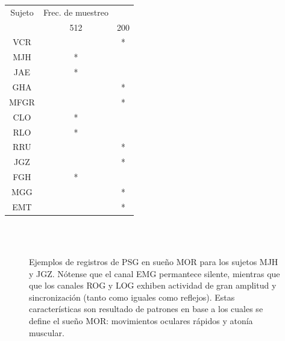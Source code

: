 \begin{table}
\begin{tabular}{c|cc}
Sujeto & Frec. de muestreo \\
& 512 & 200 \\
\hline
\hline
VCR & & * \\
MJH & * & \\ 
JAE & * & \\
GHA &  & * \\
MFGR &  & * \\
CLO & * & \\
RLO & * & \\
RRU &  & * \\
JGZ &  & * \\
\hline
FGH & * & \\
MGG &  & * \\
EMT &  & * \\
\end{tabular}
\label{frecuencias}
\end{table}

\begin{figure}
\centering
{}\\
\\
\caption{Ejemplos de registros de PSG en sue\~no MOR para los sujetos MJH y JGZ.
N\'otense que el canal EMG permantece silente, mientras que
que los canales ROG y LOG exhiben actividad de gran amplitud y sincronizaci\'on (tanto como
iguales como reflejos).
Estas caracter\'isticas son resultado de patrones en base a los cuales se define
el sue\~no MOR:
movimientos oculares r\'apidos y aton\'ia muscular.}
\label{ejemplos_mor}
\end{figure}

